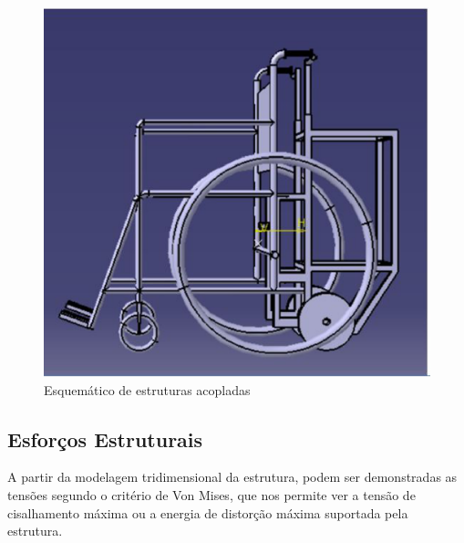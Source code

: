 \begin{figure}[!htb]
\centering
\includegraphics[keepaspectratio=true,scale=0.7]{figuras/resultados/esquematico_estr_acoplada}
\caption{Esquemático de estruturas acopladas}
\label{fig:esquematico_estr_acoplada}
\end{figure}

 \subsection{Esforços Estruturais}

A partir da modelagem tridimensional da estrutura, podem ser demonstradas as tensões segundo o critério de Von Mises, que nos permite ver a tensão de cisalhamento máxima ou a energia de distorção máxima suportada pela estrutura.

